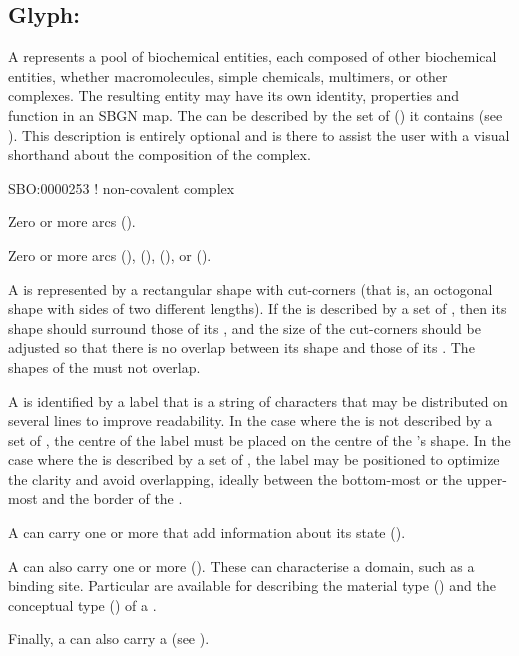 \subsection{Glyph: }\label{sec:complex}

A  represents a pool of biochemical entities, each composed of other biochemical entities, whether macromolecules, simple chemicals, multimers, or other complexes. The resulting entity may have its own identity, properties and function in an SBGN map.
The  can be described by the set of  () it contains (see ). This description is entirely optional and is there to assist the user with a visual shorthand about the composition of the complex.

\begin{glyphDescription}

\glyphSboTerm
SBO:0000253 ! non-covalent complex

\glyphIncoming
Zero or more  arcs ().

\glyphOutgoing
Zero or more  arcs (),  (),  (), or  ().

\glyphContainer
A  is represented by a rectangular shape with cut-corners (that is, an octogonal shape with sides of two different lengths).
If the  is described by a set of , then its shape should surround those of its , and the size of the cut-corners should be adjusted so that there is no overlap between its shape and those of its .
The shapes of the  must not overlap.

\glyphLabel
A  is identified by a label that is  a string of characters that may be distributed on several lines to improve readability.
In the case where the  is not described by a set of , the centre of the label must be placed on the centre of the 's shape.
In the case where the  is described by a set of , the label may be positioned to optimize the clarity and avoid overlapping, ideally between the bottom-most or the upper-most  and the border of the .

\glyphAux
A  can carry one or more  that add information about its state ().

A  can also carry one or more  ().
These can characterise a domain, such as a binding site.
Particular  are available for describing the material type () and the conceptual type () of a .

Finally, a  can also carry a  (see ).

\end{glyphDescription}

